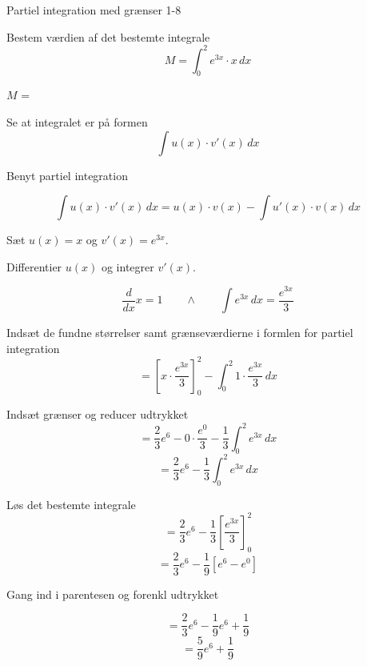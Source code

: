 \documentclass{article}
\begin{document}
\begin{exercise}{Partiel integration med grænser 1-8}


Bestem værdien af det bestemte integrale
\[
M = \int_0^2 e^{3x} \cdot x \, dx
\]

$M$ = 


\hint

Se at integralet er på formen
\[
\int u(x) \cdot v'(x) \, dx
\]

\hint

Benyt partiel integration

\hint
\[
\int u(x) \cdot v'(x)\, dx = u(x) \cdot v(x) - \int u'(x) \cdot v(x) \, dx
\]
\hint

Sæt $u(x) = x$ og $v'(x) = e^{3x}$.


\hint

Differentier $u(x)$ og integrer $v'(x)$.

\hint
\[
\frac{d}{dx}x = 1 \qquad \wedge \qquad \int e^{3x} \, dx = \frac{e^{3x}}{3}
\]

\hint

Indsæt de fundne størrelser samt grænseværdierne i formlen for partiel integration
\[
= \left[x \cdot \frac{e^{3x}}{3}\right]_{0}^{2} - \int_{0}^{2} 1 \cdot \frac{e^{3x}}{3} \, dx
\]

\hint

Indsæt grænser og reducer udtrykket
\[
= \frac{2}{3} e^6 - 0 \cdot \frac{e^0}{3} - \frac{1}{3} \int_{0}^{2} e^{3x} \, dx
\]
\[
= \frac{2}{3} e^6 - \frac{1}{3} \int_{0}^{2} e^{3x} \, dx
\]

\hint
Løs det bestemte integrale
\[
= \frac{2}{3} e^6 - \frac{1}{3} \left[\frac{e^{3x}}{3} \right]_0^2
\]
\[
= \frac{2}{3} e^6 - \frac{1}{9} \left[e^{6}-e^0\right]
\]

\hint
Gang ind i parentesen og forenkl udtrykket

\hint
\[
= \frac{2}{3} e^6 - \frac{1}{9} e^{6} + \frac{1}{9}
\]
\[
= \frac{5}{9} e^6 + \frac{1}{9}
\]



\end{exercise}
\end{document}
